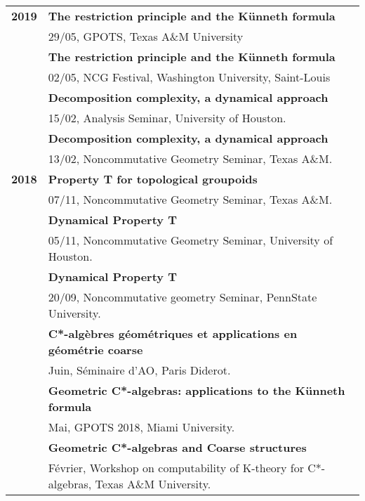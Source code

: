 \documentclass[a4paper,11pt]{article}
\newcommand\espace{\vrule height 20pt width 0pt}
\begin{document}
\begin{tabular}{cp{}}
\textbf{2019} 	& \textbf{The restriction principle and the Künneth formula}\\ %
				& 29/05, GPOTS, Texas A\&M University \\   
				& \textbf{The restriction principle and the Künneth formula}\\	
				& 02/05, NCG Festival, Washington University, Saint-Louis \\ %
				& \textbf{Decomposition complexity, a dynamical approach}\\
				& 15/02, Analysis Seminar, University of Houston. \\ %
				& \textbf{Decomposition complexity, a dynamical approach}\\
				& 13/02, Noncommutative Geometry Seminar, Texas A\&M.  \\ %
				\espace
\textbf{2018} & \textbf{Property T for topological groupoids}\\
				& 07/11, Noncommutative Geometry Seminar, Texas A\&M. \\ %
				& \textbf{Dynamical Property T}\\
				& 05/11, Noncommutative Geometry Seminar, University of Houston. \\ %
				& \textbf{Dynamical Property T}\\
				& 20/09, Noncommutative geometry Seminar, PennState University.\\
				& \textbf{C*-alg\`ebres g\'eom\'etriques et applications en g\'eom\'etrie coarse}\\
				& Juin, S\'eminaire d'AO, Paris Diderot.\\
				& \textbf{Geometric C*-algebras: applications to the K\"unneth formula}\\
				& Mai, GPOTS 2018, Miami University.\\
				& \textbf{Geometric C*-algebras and Coarse structures}\\
				& F\'evrier, Workshop on computability of K-theory for C*-algebras, Texas A\&M University.\\
\end{tabular}  
\end{document}

